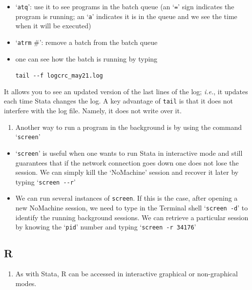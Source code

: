 \documentclass[
  11pt,
  a4paper,
]{article}
\providecommand{\tightlist}{%
  \setlength{\itemsep}{0pt}\setlength{\parskip}{0pt}}
\begin{document}
\begin{itemize}
\item
  `\texttt{atq}': use it to see programs in the batch queue (an
  `\texttt{=}' sign indicates the program is running; an `\texttt{a}'
  indicates it is in the queue and we see the time when it will be
  executed)
\item
  `\texttt{atrm} \#': remove a batch from the batch queue
\item
  one can see how the batch is running by typing

  \texttt{tail\ -\/-f\ logcrc\_may21.log}
\end{itemize}

It allows you to see an updated version of the last lines of the log;
\emph{i.e.}, it updates each time Stata changes the log. A key advantage
of \texttt{tail} is that it does not interfere with the log file.
Namely, it does not write over it.

\begin{enumerate}
\def\labelenumi{\arabic{enumi}.}
\setcounter{enumi}{14}
\tightlist
\item
  Another way to run a program in the background is by using the command
  `\texttt{screen}'
\end{enumerate}

\begin{itemize}
\item
  `\texttt{screen}' is useful when one wants to run Stata in interactive
  mode and still guarantees that if the network connection goes down one
  does not lose the session. We can simply kill the `NoMachine' session
  and recover it later by typing `\texttt{screen\ -\/-r}'
\item
  We can run several instances of \texttt{screen}. If this is the case,
  after opening a new NoMachine session, we need to type in the Terminal
  shell `\texttt{screen\ -d}' to identify the running background
  sessions. We can retrieve a particular session by knowing the
  `\texttt{pid}' number and typing `\texttt{screen\ -r\ 34176}'
\end{itemize}

\hypertarget{r}{%
\subsection{R}\label{r}}

\begin{enumerate}
\def\labelenumi{\arabic{enumi}.}
\tightlist
\item
  As with Stata, R can be accessed in interactive graphical or
  non-graphical modes.
\end{enumerate}
\end{document}
